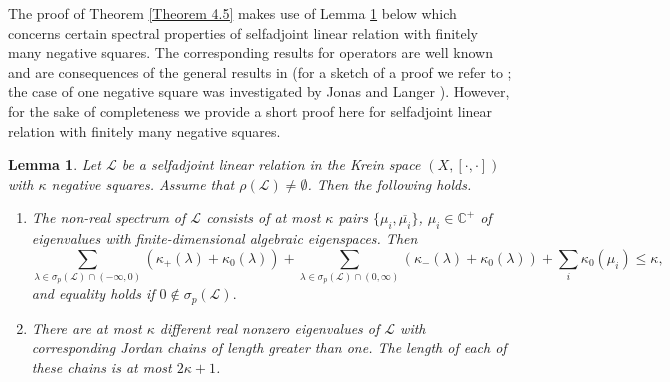 \documentclass{birkjour}
\newtheorem{lem}[thm]{Lemma}
\theoremstyle{definition}
\theoremstyle{remark}
\numberwithin{equation}{section}
\newcommand{\C}{\mathbb C}
\newcommand{\Ll}{\mathcal L}
\begin{document}
The proof of Theorem \ref{Theorem 4.5} makes use of Lemma \ref{Lemma4} below which concerns certain spectral properties of selfadjoint linear relation with finitely many negative squares. 
The corresponding results for operators are well known
and are consequences of the general results in \cite{Lhabil, L82} (for a sketch of a proof we refer to \cite{BT07}; the case of one negative square was investigated by Jonas and Langer \cite{JL07}). However, for the sake of completeness we provide a short proof here
for  selfadjoint linear relation with finitely many negative squares. 


\begin{lem}\label{Lemma4}
Let $\Ll$ be a selfadjoint linear relation in the Krein space $(X, [\cdot, \cdot])$ with $\kappa$ negative squares. Assume that $\rho(\Ll)\neq \emptyset$. Then the following holds. \begin{enumerate}
    \item The non-real spectrum of $\Ll$ consists of at most $\kappa$ pairs $\{\mu_i, \overline{\mu_i}\}$, $\mu_i \in \C^+$ of eigenvalues with finite-dimensional algebraic eigenspaces. Then 
    \begin{equation}\label{Fertig}
        \sum_{\lambda \in \sigma_p(\Ll)\cap (-\infty,0)}(\kappa_+(\lambda)+\kappa_0(\lambda))+ \sum_{\lambda \in \sigma_p(\Ll)\cap (0, \infty)}(\kappa_-(\lambda)+\kappa_0(\lambda))+ \sum_{i}\kappa_0(\mu_i)\leqslant \kappa,
    \end{equation}
    and equality holds if $0\notin \sigma_p(\Ll).$
    \item There are at most $\kappa$ different real nonzero eigenvalues of $\Ll$ with corresponding Jordan
 chains of length greater than one. The length of each of these chains is at most $2\kappa +1$.
\end{enumerate}
\end{lem}
\end{document}
